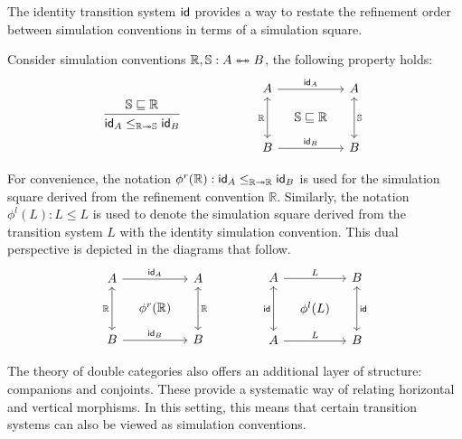 The identity transition system $ \mathsf{id} $
provides a way to
restate the refinement order
between simulation conventions
in terms of a simulation square.
\begin{theorem}
  \label{thm:ox:sc-ref}
  Consider simulation conventions
  $\mathbb{R}, \mathbb{S} : A \twoheadleftarrow \mathrel{\mkern-15mu} \twoheadrightarrow B$,
  the following property holds:
  \[
    \begin{prooftree}
      \hypo{\mathbb{S} \sqsubseteq \mathbb{R}}
      \infer1{\kw{id}_A \le_{\mathbb{R} \twoheadrightarrow \mathbb{S}} \kw{id}_B}
    \end{prooftree}
    \qquad \qquad \qquad
    \begin{tikzcd}[row sep=2ex, column sep=2ex]
      A \ar[rr, "\kw{id}_A"] \ar[dd, leftrightarrow, "\mathbb{R}"'] && A \ar[dd, leftrightarrow, "\mathbb{S}"] \\
      &\mathbb{S} \sqsubseteq \mathbb{R} & \\
      B \ar[rr, "\kw{id}_B"] && B
    \end{tikzcd}
  \]
\end{theorem}
For convenience, the notation
$\phi^r(\mathbb{R}) :  \mathsf{id} _A \le_{\mathbb{R} \twoheadrightarrow \mathbb{R}}  \mathsf{id} _B$
is used for the simulation square derived from the refinement convention $\mathbb{R}$.
Similarly,
the notation $\phi^l(L) : L \le L$
is used to denote the simulation square derived from the transition system $L$
with the identity simulation convention.
This dual perspective is depicted in the diagrams that follow.
\[
  \begin{tikzcd}[row sep=2ex, column sep=2ex]
    A \ar[rr, "\kw{id}_A"] \ar[dd, leftrightarrow, "\mathbb{R}"'] && A \ar[dd, leftrightarrow, "\mathbb{R}"] \\
    &\phi^r(\mathbb{R}) & \\
    B \ar[rr, "\kw{id}_B"] && B
  \end{tikzcd}
  \qquad
  \qquad
  \begin{tikzcd}[row sep=2ex, column sep=2ex]
    A \ar[rr, "L"] \ar[dd, leftrightarrow, "\kw{id}"'] && B \ar[dd, leftrightarrow, "\kw{id}"] \\
    &\phi^l(L) & \\
    A \ar[rr, "L"] && B
  \end{tikzcd}
\]

The theory of double categories also offers
an additional layer of structure: companions and conjoints.
These provide a systematic way of
relating horizontal and vertical morphisms.
In this setting, this means that certain transition systems
can also be viewed as simulation conventions.

